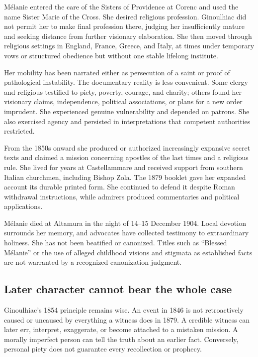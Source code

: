 Mélanie entered the care of the Sisters of Providence at Corenc and used the name Sister Marie of the Cross. She desired religious profession. Ginoulhiac did not permit her to make final profession there, judging her insufficiently mature and seeking distance from further visionary elaboration. She then moved through religious settings in England, France, Greece, and Italy, at times under temporary vows or structured obedience but without one stable lifelong institute.

Her mobility has been narrated either as persecution of a saint or proof of pathological instability. The documentary reality is less convenient. Some clergy and religious testified to piety, poverty, courage, and charity; others found her visionary claims, independence, political associations, or plans for a new order imprudent. She experienced genuine vulnerability and depended on patrons. She also exercised agency and persisted in interpretations that competent authorities restricted.

From the 1850s onward she produced or authorized increasingly expansive secret texts and claimed a mission concerning apostles of the last times and a religious rule. She lived for years at Castellammare and received support from southern Italian churchmen, including Bishop Zola. The 1879 booklet gave her expanded account its durable printed form. She continued to defend it despite Roman withdrawal instructions, while admirers produced commentaries and political applications.

Mélanie died at Altamura in the night of 14--15 December 1904. Local devotion surrounds her memory, and advocates have collected testimony to extraordinary holiness. She has not been beatified or canonized. Titles such as ``Blessed Mélanie'' or the use of alleged childhood visions and stigmata as established facts are not warranted by a recognized canonization judgment.

\subsection{Later character cannot bear the whole case}

Ginoulhiac's 1854 principle remains wise. An event in 1846 is not retroactively caused or uncaused by everything a witness does in 1879. A credible witness can later err, interpret, exaggerate, or become attached to a mistaken mission. A morally imperfect person can tell the truth about an earlier fact. Conversely, personal piety does not guarantee every recollection or prophecy.

